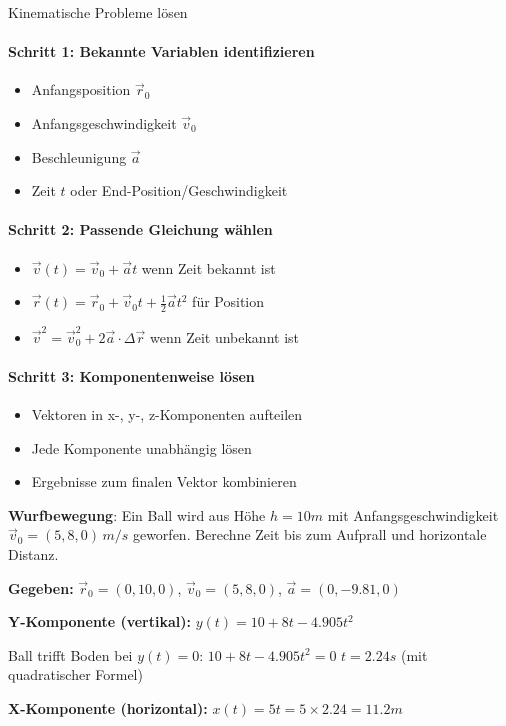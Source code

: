 \begin{KR}{Kinematische Probleme lösen}
    \paragraph{Schritt 1: Bekannte Variablen identifizieren}
    \begin{itemize}
        \item Anfangsposition $\vec{r}_0$
        \item Anfangsgeschwindigkeit $\vec{v}_0$
        \item Beschleunigung $\vec{a}$
        \item Zeit $t$ oder End-Position/Geschwindigkeit
    \end{itemize}
    
    \paragraph{Schritt 2: Passende Gleichung wählen}
    \begin{itemize}
        \item $\vec{v}(t) = \vec{v}_0 + \vec{a}t$ wenn Zeit bekannt ist
        \item $\vec{r}(t) = \vec{r}_0 + \vec{v}_0 t + \frac{1}{2}\vec{a}t^2$ für Position
        \item $\vec{v}^2 = \vec{v}_0^2 + 2\vec{a} \cdot \Delta\vec{r}$ wenn Zeit unbekannt ist
    \end{itemize}
    
    \paragraph{Schritt 3: Komponentenweise lösen}
    \begin{itemize}
        \item Vektoren in x-, y-, z-Komponenten aufteilen
        \item Jede Komponente unabhängig lösen
        \item Ergebnisse zum finalen Vektor kombinieren
    \end{itemize}
\end{KR}

\multend

\begin{example} \textbf{Wurfbewegung}:
    Ein Ball wird aus Höhe $h = 10m$ mit Anfangsgeschwindigkeit $\vec{v}_0 = (5, 8, 0) \, m/s$ geworfen. Berechne Zeit bis zum Aufprall und horizontale Distanz.
    
    \textbf{Gegeben:} $\vec{r}_0 = (0, 10, 0)$, $\vec{v}_0 = (5, 8, 0)$, $\vec{a} = (0, -9.81, 0)$
    
    \textbf{Y-Komponente (vertikal):}
    $y(t) = 10 + 8t - 4.905t^2$
    
    Ball trifft Boden bei $y(t) = 0$:
    $10 + 8t - 4.905t^2 = 0$
    $t = 2.24s$ (mit quadratischer Formel)
    
    \textbf{X-Komponente (horizontal):}
    $x(t) = 5t = 5 \times 2.24 = 11.2m$
\end{example}

